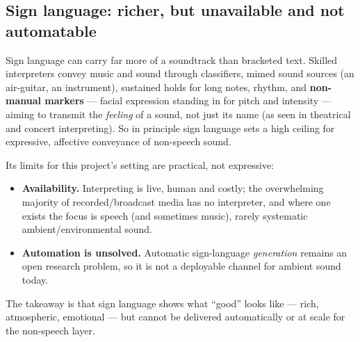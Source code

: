 \documentclass[11pt,a4paper]{article}
\begin{document}
\subsection{Sign language: richer, but unavailable and not automatable}
Sign language can carry far more of a soundtrack than bracketed text. Skilled interpreters convey
music and sound through classifiers, mimed sound sources (an air-guitar, an instrument), sustained
holds for long notes, rhythm, and \textbf{non-manual markers} --- facial expression standing in for
pitch and intensity --- aiming to transmit the \emph{feeling} of a sound, not just its name (as seen
in theatrical and concert interpreting). So in principle sign language sets a high ceiling for
expressive, affective conveyance of non-speech sound.

Its limits for this project's setting are practical, not expressive:
\begin{itemize}
  \item \textbf{Availability.} Interpreting is live, human and costly; the overwhelming majority of
    recorded/broadcast media has no interpreter, and where one exists the focus is speech (and
    sometimes music), rarely systematic ambient/environmental sound.
  \item \textbf{Automation is unsolved.} Automatic sign-language \emph{generation} remains an open
    research problem, so it is not a deployable channel for ambient sound today.
\end{itemize}
The takeaway is that sign language shows what ``good'' looks like --- rich, atmospheric, emotional ---
but cannot be delivered automatically or at scale for the non-speech layer.
\end{document}

